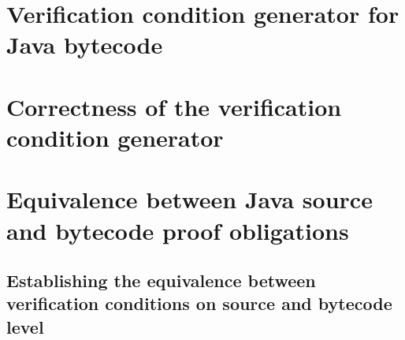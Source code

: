 \documentclass[book,10pt]{book}
\begin{document}
\chapter{Verification condition generator for Java bytecode } \label{wpGeneral}
    
   
  
   
  
  
  
   
  

\chapter{Correctness of the verification condition generator}\label{proofGeneral}
  
   
  
  
  



\chapter{Equivalence between Java source and bytecode proof obligations}\label{pogEquiv}
  
 
 
   
	 
  
   
  


 \section{Establishing the equivalence between verification conditions on source and bytecode level} \label{pog:wpBcGeneral}
    
    
 
\end{document}
